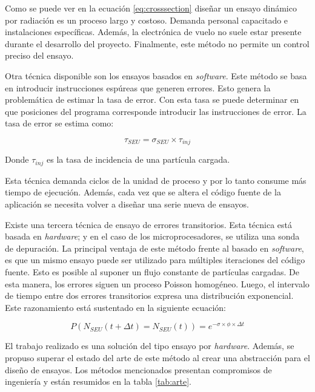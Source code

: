 Como se puede ver en la ecuación \ref{eq:crosssection} diseñar un ensayo dinámico por radiación es un proceso largo y costoso.
Demanda personal capacitado e instalaciones específicas.
Además, la electrónica de vuelo no suele estar presente durante el desarrollo del proyecto.
Finalmente, este método no permite un control preciso del ensayo.

Otra técnica disponible son los ensayos basados en \emph{software}.
Este método se basa en introducir instrucciones espúreas que generen errores.
Esto genera la problemática de estimar la tasa de error.
Con esta tasa se puede determinar en que posiciones del programa corresponde introducir las instrucciones de error.
La tasa de error se estima como:

\begin{equation}
	\label{eq:errorrate}
    \tau_{SEU} = \sigma_{SEU} \times \tau_{inj}
\end{equation}

Donde $ \tau_{inj} $ es la tasa de incidencia de una partícula cargada.

Esta técnica demanda ciclos de la unidad de proceso y por lo tanto consume más tiempo de ejecución.
Además, cada vez que se altera el código fuente de la aplicación se necesita volver a diseñar una serie nueva de ensayos.

Existe una tercera técnica de ensayo de errores transitorios.
Esta técnica está basada en \emph{hardware}; y en el caso de los microprocesadores, se utiliza una sonda de depuración.
La principal ventaja de este método frente al basado en \emph{software}, es que un mismo ensayo puede ser utilizado para múltiples iteraciones del código fuente.
Esto es posible al suponer un flujo constante de partículas cargadas.
De esta manera, los errores siguen un proceso Poisson homogéneo.
Luego, el intervalo de tiempo entre dos errores transitorios expresa una distribución exponencial.
Este razonamiento está sustentado en la siguiente ecuación:

\begin{equation}
	\label{eq:poisson}
    P(N_{SEU}(t + \Delta t) = N_{SEU}(t) ) = e^{-\sigma \times \phi \times \Delta t}
\end{equation}

El trabajo realizado es una solución del tipo ensayo por \emph{hardware}.
Además, se propuso superar el estado del arte de este método al crear una abstracción para el diseño de ensayos.
Los métodos mencionados presentan compromisos de ingeniería y están resumidos en la tabla \ref{tab:arte}.

